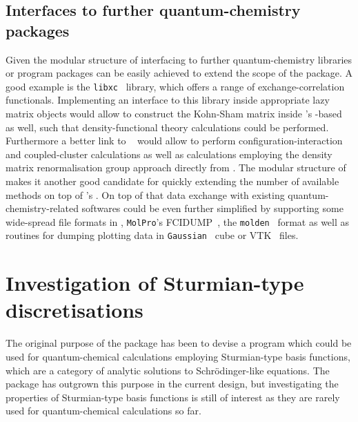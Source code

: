 \subsection{Interfaces to further quantum-chemistry packages}
\label{sec:ExtensionInterfaces}
Given the modular structure of \molsturm
interfacing to further quantum-chemistry libraries or program packages
can be easily achieved to extend the scope of the package.
A good example is the \texttt{libxc}~\cite{Lehtola2018} library,
which offers a range of exchange-correlation functionals.
Implementing an interface to this library inside appropriate
lazy matrix objects would allow to construct the Kohn-Sham matrix
inside \molsturm's \contraction-based \SCF as well,
such that density-functional theory calculations
could be performed.
Furthermore a better link to \pyscf~\cite{Sun2017}
would allow to perform configuration-interaction
and coupled-cluster calculations as well as calculations
employing the density matrix renormalisation group approach
directly from \molsturm.
The modular structure of \psifour makes it another good candidate
for quickly extending the number of available methods
on top of \molsturm's \SCF.
On top of that data exchange with existing quantum-chemistry-related softwares
could be even further simplified by supporting
some wide-spread file formats in \molsturm,
\eg \texttt{MolPro}'s FCIDUMP~\cite{Knowles1989},
the \texttt{molden}~\cite{Schaftenaar2000} format
as well as routines for dumping plotting data
in \texttt{Gaussian}~\cite{Frisch2016} cube or VTK~\cite{Avila2010} files.

\section{Investigation of Sturmian-type discretisations}
The original purpose of the \molsturm package has been to devise a program
which could be used for quantum-chemical calculations
employing Sturmian-type basis functions,
which are a category of analytic solutions to Schrödinger-like equations.
The package has outgrown this purpose in the current design,
but investigating the properties of Sturmian-type basis functions is still of interest
as they are rarely used for quantum-chemical calculations so far.

